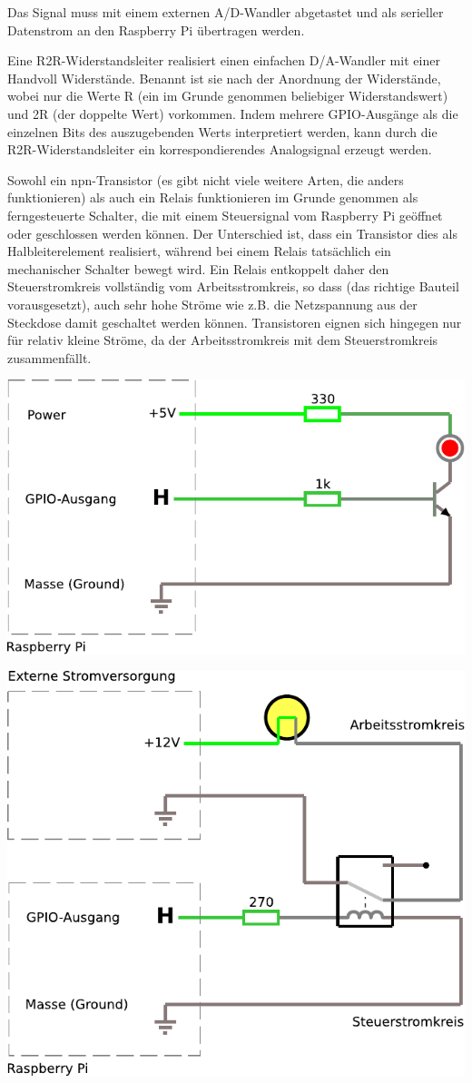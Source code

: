 \bigskip
\teilaufgabe
Das Signal muss mit einem externen A/D-Wandler abgetastet und als serieller
Datenstrom an den Raspberry Pi übertragen werden.

\bigskip
\teilaufgabe
Eine R2R-Widerstandsleiter realisiert einen einfachen D/A-Wandler mit einer
Handvoll Widerstände. Benannt ist sie nach der Anordnung der Widerstände, wobei
nur die Werte R (ein im Grunde genommen beliebiger Widerstandswert) und 2R (der
doppelte Wert) vorkommen. Indem mehrere GPIO-Ausgänge als die einzelnen Bits
des auszugebenden Werts interpretiert werden, kann durch die R2R-Widerstandsleiter
ein korrespondierendes Analogsignal erzeugt werden.

\bigskip
\teilaufgabe
Sowohl ein npn-Transistor (es gibt nicht viele weitere Arten, die anders funktionieren)
als auch ein Relais funktionieren im Grunde genommen als ferngesteuerte Schalter, die
mit einem Steuersignal vom Raspberry Pi geöffnet oder geschlossen werden können. Der
Unterschied ist, dass ein Transistor dies als Halbleiterelement realisiert, während bei
einem Relais tatsächlich ein mechanischer Schalter bewegt wird. Ein Relais entkoppelt
daher den Steuerstromkreis vollständig vom Arbeitsstromkreis, so dass (das richtige
Bauteil vorausgesetzt), auch sehr hohe Ströme wie z.B. die Netzspannung aus der
Steckdose damit geschaltet werden können. Transistoren eignen sich hingegen nur für
relativ kleine Ströme, da der Arbeitsstromkreis mit dem Steuerstromkreis zusammenfällt.

\begin{center}
    \includegraphics[width=.8\linewidth]{img/led_transistor_circuitjs}
    \bigskip

    \includegraphics[width=.8\linewidth]{img/led_relais_circuitjs}
\end{center}

